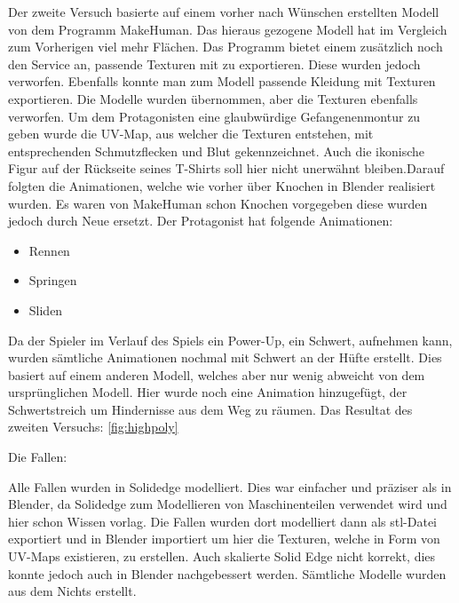 \documentclass[10pt]{article}
\begin{document}
\noindent Der zweite Versuch basierte auf einem vorher nach Wünschen erstellten Modell von dem Programm MakeHuman. Das hieraus gezogene Modell hat im Vergleich zum Vorherigen
viel mehr Flächen. Das Programm bietet einem zusätzlich noch den Service an, passende Texturen mit zu exportieren. Diese wurden jedoch verworfen. Ebenfalls konnte man zum
Modell passende Kleidung mit Texturen exportieren. Die Modelle wurden übernommen, aber die Texturen ebenfalls verworfen. Um dem Protagonisten eine glaubwürdige
Gefangenenmontur zu geben wurde die UV-Map, aus welcher die Texturen entstehen, mit entsprechenden Schmutzflecken und Blut gekennzeichnet. Auch die ikonische Figur
auf der Rückseite seines T-Shirts soll hier nicht unerwähnt bleiben.Darauf folgten die Animationen, welche wie vorher über Knochen in Blender realisiert wurden.
Es waren von MakeHuman schon Knochen vorgegeben diese wurden jedoch durch Neue ersetzt. 
Der Protagonist hat folgende Animationen:
\begin{itemize}
	\item Rennen
	\item Springen
	\item Sliden
\end{itemize}

\vspace{0.2cm}

\noindent Da der Spieler im Verlauf des Spiels ein Power-Up, ein Schwert, aufnehmen kann, wurden sämtliche Animationen nochmal mit Schwert an der Hüfte erstellt. Dies basiert auf
einem anderen Modell, welches aber nur wenig abweicht von dem ursprünglichen Modell. Hier wurde noch eine Animation hinzugefügt, der Schwertstreich um Hindernisse aus dem
Weg zu räumen. Das Resultat des zweiten Versuchs: \ref{fig:highpoly} \newline

\newpage
\noindent Die Fallen:\newline

\noindent Alle Fallen wurden in Solidedge modelliert. Dies war einfacher und präziser als in Blender, da Solidedge zum Modellieren von Maschinenteilen verwendet wird und hier schon Wissen vorlag.
Die Fallen wurden dort modelliert dann als stl-Datei exportiert und in Blender importiert um hier die Texturen, welche in Form von UV-Maps existieren, zu erstellen. Auch skalierte Solid Edge
nicht korrekt, dies konnte jedoch auch in Blender nachgebessert werden. Sämtliche Modelle wurden aus dem Nichts erstellt.\newline
\end{document}
